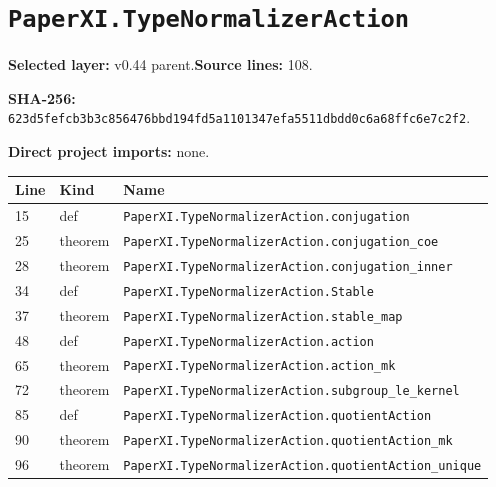 \documentclass[10pt,oneside]{book}
\begin{document}
\section{\texorpdfstring{\nolinkurl{PaperXI.TypeNormalizerAction}}{PaperXI.TypeNormalizerAction}}\label{module:PaperXI.TypeNormalizerAction}

\textbf{Selected layer:} v0.44 parent.\quad\textbf{Source lines:} 108.\par\textbf{SHA-256:} {\scriptsize\nolinkurl{623d5fefcb3b3c856476bbd194fd5a1101347efa5511dbdd0c6a68ffc6e7c2f2}}.


\textbf{Direct project imports:} none.

\begin{longtable}{@{}p{}p{}p{}@{}}\toprule Line&Kind&Name\\\midrule\endhead

15&def&\nolinkurl{PaperXI.TypeNormalizerAction.conjugation}\\

25&theorem&\nolinkurl{PaperXI.TypeNormalizerAction.conjugation_coe}\\

28&theorem&\nolinkurl{PaperXI.TypeNormalizerAction.conjugation_inner}\\

34&def&\nolinkurl{PaperXI.TypeNormalizerAction.Stable}\\

37&theorem&\nolinkurl{PaperXI.TypeNormalizerAction.stable_map}\\

48&def&\nolinkurl{PaperXI.TypeNormalizerAction.action}\\

65&theorem&\nolinkurl{PaperXI.TypeNormalizerAction.action_mk}\\

72&theorem&\nolinkurl{PaperXI.TypeNormalizerAction.subgroup_le_kernel}\\

85&def&\nolinkurl{PaperXI.TypeNormalizerAction.quotientAction}\\

90&theorem&\nolinkurl{PaperXI.TypeNormalizerAction.quotientAction_mk}\\

96&theorem&\nolinkurl{PaperXI.TypeNormalizerAction.quotientAction_unique}\\

\bottomrule\end{longtable}
\end{document}
